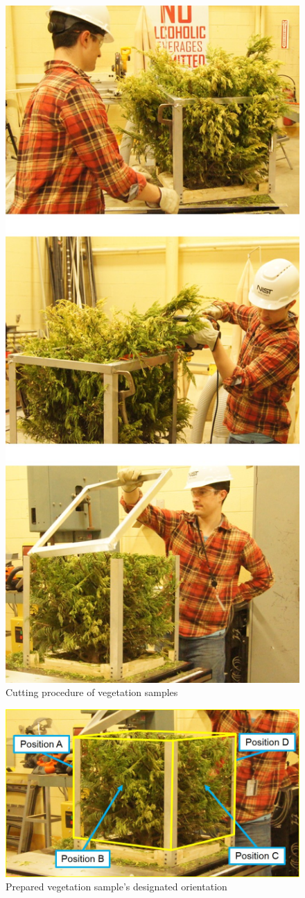 \documentclass[12pt]{article}
\begin{document}
\begin{figure} [!]
	\centering 	
	\includegraphics[height=8.in,keepaspectratio]{Picture2.jpg}
	\caption{Cutting procedure of vegetation samples}
	\label{fig:Sampleprep}
\end{figure}
\begin{figure} [!]
	\centering 	\includegraphics[width=1.0\linewidth]{Picture3.jpg}
	\caption{Prepared vegetation sample's designated orientation}
	\label{fig:Vegpos}
\end{figure}
\end{document}

